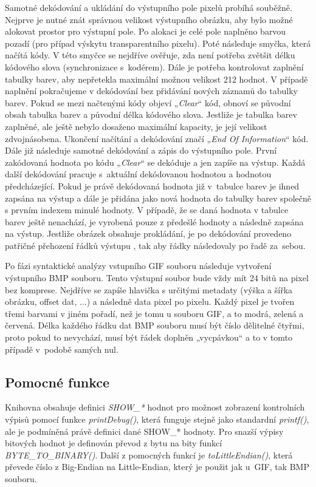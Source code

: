\documentclass[a4paper,12pt,times]{article}
\begin{document}
Samotné dekódování \cite{lzw} a ukládání do výstupního pole pixelů probíhá souběžně. Nejprve je nutné znát správnou velikost výstupního obrázku, aby bylo možné alokovat prostor pro výstupní pole. Po alokaci je celé pole naplněno barvou pozadí (pro případ výskytu transparentního pixelu). Poté následuje smyčka, která načítá kódy. V této smyčce se nejdříve ověřuje, zda není potřeba zvětšit délku kódového slova (synchronizace s~kodérem). Dále je potřeba kontrolovat zaplnění tabulky barev, aby nepřetekla maximální možnou velikost 212 hodnot. V případě naplnění pokračujeme v dekódování bez přidávání nových záznamů do tabulky barev. Pokud se mezi načtenými kódy objeví „\textit{Clear}“ kód, obnoví se původní obsah tabulka barev a původní délka kódového slova. Jestliže je tabulka barev zaplněné, ale ještě nebylo dosaženo maximální kapacity, je její velikost zdvojnásobena. Ukončení načítání a dekódování značí „\textit{End Of Information}“ kód. Dále již následuje samotné dekódování a zápis do výstupního pole. První zakódovaná hodnota po kódu „\textit{Clear}“ se dekóduje a jen zapíše na výstup. Každá další dekódování pracuje s~aktuální dekódovanou hodnotou a hodnotou předcházející. Pokud je právě dekódovaná hodnota již v~tabulce barev je ihned zapsána na výstup a dále je přidána jako nová hodnota do tabulky barev společně s prvním indexem minulé hodnoty. V případě, že se daná hodnota v tabulce barev ještě nenachází, je vyrobená pouze z předešlé hodnoty a následně zapsána na výstup. Jestliže obrázek obsahuje prokládání, je po dekódování provedeno patřičné přehození řádků výstupu \cite{egff}, tak aby řádky následovaly po řadě za~sebou.

Po fázi syntaktické analýzy vstupního GIF souboru následuje vytvoření výstupního BMP souboru. Tento výstupní soubor bude vždy mít 24 bitů na pixel bez komprese. Nejdříve se zapíše hlavička s určitými metadaty (výška a šířka obrázku, offset dat, ...) a následně data pixel po pixelu. Každý pixel je tvořen třemi barvami v jiném pořadí, než je tomu u souboru GIF, a to modrá, zelená a červená. Délka každého řádku dat BMP souboru musí být číslo dělitelné čtyřmi, proto pokud to nevychází, musí být řádek doplněn „vycpávkou“ a to v tomto případě v~podobě samých nul.
	
\subsection{Pomocné funkce}
\label{sec:pomocne_funkce}
Knihovna obsahuje definici \textit{SHOW\_*} hodnot pro možnost zobrazení kontrolních výpisů pomocí funkce \textit{printDebug()}, která funguje stejně jako standardní \textit{printf()}, ale je podmíněná právě definici dané SHOW\_* hodnoty. Pro snazší výpisy bitových hodnot je definován převod z bytu na bity funkcí \textit{BYTE\_TO\_BINARY()}. Další z pomocných funkcí je \textit{toLittleEndian()}, která převede číslo z Big-Endian na Little-Endian, který je použit jak u~GIF, tak BMP souboru.
\end{document}
